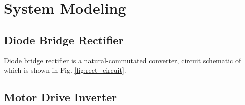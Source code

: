 \chapter{System Modeling}
\label{chap:system-modeling}

\section{Diode Bridge Rectifier}
Diode bridge rectifier is a natural-commutated converter, circuit schematic of which is shown in Fig. \ref{fig:rect_circuit}.

\section{Motor Drive Inverter}
